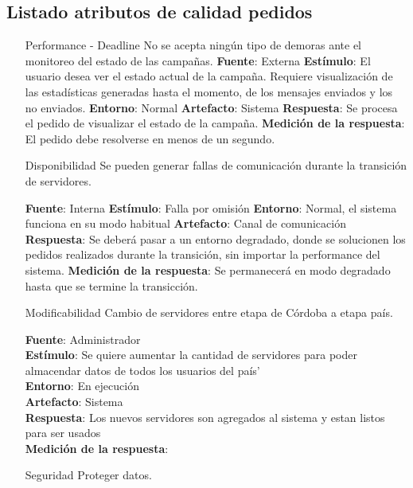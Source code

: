 \documentclass[a4paper, 11pt]{article}
\begin{document}
\subsection{Listado atributos de calidad pedidos}
\begin{itemize}

\item[Performance - Deadline] No se acepta ningún tipo de demoras ante el monitoreo del estado de las campañas.
\textbf{Fuente}: Externa
\textbf{Estímulo}: El usuario desea ver el estado actual de la campaña. Requiere visualización de las estadísticas generadas hasta el momento, de los mensajes enviados y los no enviados. 
\textbf{Entorno}: Normal
\textbf{Artefacto}: Sistema
\textbf{Respuesta}: Se procesa el pedido de visualizar el estado de la campaña.
\textbf{Medición de la respuesta}: El pedido debe resolverse en menos de un segundo. 

\item[Disponibilidad] Se pueden generar fallas de comunicación durante la transición de servidores.

\textbf{Fuente}: Interna
\textbf{Estímulo}: Falla por omisión
\textbf{Entorno}: Normal, el sistema funciona en su modo habitual
\textbf{Artefacto}: Canal de comunicación
\textbf{Respuesta}: Se deberá pasar a un entorno degradado, donde se solucionen los pedidos realizados durante la transición, sin importar la performance del sistema.
\textbf{Medición de la respuesta}:  Se permanecerá en modo degradado hasta que se termine la transicción.

\item[Modificabilidad] Cambio de servidores entre etapa de Córdoba a etapa país.

\textbf{Fuente}: Administrador \\
\textbf{Estímulo}: Se quiere aumentar la cantidad de servidores para poder almacendar datos de todos los usuarios del pa\'is' \\
\textbf{Entorno}: En ejecución \\
\textbf{Artefacto}: Sistema \\
\textbf{Respuesta}: Los nuevos servidores son agregados al sistema y estan listos para ser usados \\
\textbf{Medición de la respuesta}:  \\


\item[Seguridad] Proteger datos.


\end{itemize}
\end{document}
